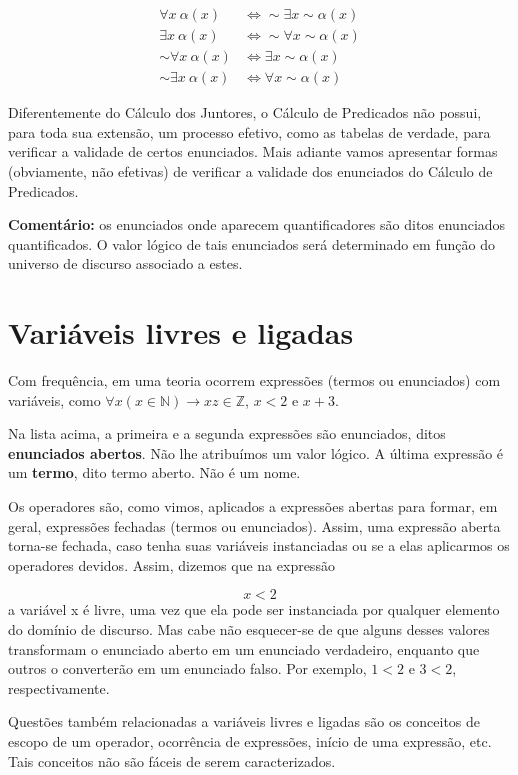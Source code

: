 \begin{align*}
    \forall x\ \alpha (x) & \iff \sim \exists x \sim \alpha (x) \\
    \exists x\ \alpha (x) & \iff \sim \forall x \sim \alpha (x) \\
    \sim \forall x\ \alpha (x) & \iff \exists x \sim \alpha (x) \\
    \sim \exists x\ \alpha (x) & \iff \forall x \sim \alpha (x)
\end{align*}

Diferentemente do Cálculo dos Juntores, o  Cálculo de Predicados não possui, para toda sua extensão, um  processo efetivo, como as tabelas de verdade, para verificar a validade de certos enunciados.
Mais adiante vamos apresentar formas (obviamente, não efetivas) de verificar a validade dos enunciados do Cálculo de Predicados.

\noindent \textbf{Comentário:} os enunciados onde aparecem quantificadores são ditos enunciados quantificados.
O valor lógico de tais enunciados será determinado em função do universo de discurso associado a estes.


\section{Variáveis livres e ligadas}
Com frequência, em uma teoria ocorrem expressões (termos ou  enunciados) com variáveis, como $\forall x (x \in \mathbb{N}) \to  x z \in \mathbb{Z}$, $x < 2$ e $x + 3$.

Na  lista acima, a primeira e a segunda expressões são enunciados, ditos \textbf{enunciados abertos}.
Não lhe atribuímos um valor lógico.
A última expressão é um \textbf{termo}, dito termo aberto.
Não é um nome.

Os operadores são, como vimos, aplicados a  expressões abertas para formar, em  geral, expressões fechadas (termos ou enunciados).
Assim, uma expressão aberta torna-se fechada, caso tenha suas variáveis instanciadas ou se a elas aplicarmos os operadores devidos.
Assim, dizemos que na expressão

$$x < 2$$
a variável x é livre, uma vez que ela pode ser instanciada por qualquer elemento do domínio de discurso.
Mas cabe não esquecer-se de que alguns desses valores transformam o  enunciado aberto em um enunciado verdadeiro, enquanto que outros o converterão em um enunciado falso.
Por exemplo, $1 < 2$ e $3 < 2$, respectivamente.

Questões também relacionadas a variáveis livres e ligadas são os conceitos de escopo de um  operador, ocorrência de expressões, início de uma expressão, etc.
Tais conceitos não são fáceis de serem caracterizados.

